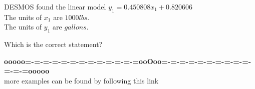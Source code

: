 \documentclass{ximera}
\begin{document}
\begin{question}


DESMOS found the linear model $y_1 = 0.450808 x_1 + 0.820606$ \\


The units of $x_1$ are $1000 lbs$. \\
The units of $y_1$ are $gallons$.



Which is the correct statement?

\begin{multipleChoice}
\end{multipleChoice}


\end{question}




















\begin{center}
\textbf{\textcolor{green!50!black}{ooooo=-=-=-=-=-=-=-=-=-=-=-=-=ooOoo=-=-=-=-=-=-=-=-=-=-=-=-=ooooo}} \\

more examples can be found by following this link\\ 

\end{center}
\end{document}
